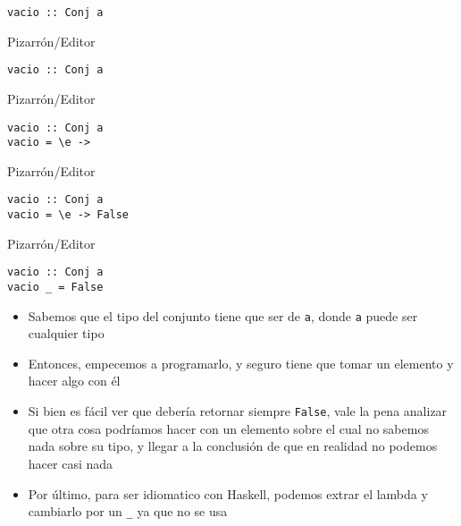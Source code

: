 \documentclass[pdf]{beamer}
\begin{document}
\begin{frame}[fragile]{\texttt{vacio :: Conj a}}

\begin{overprint}
    
\begin{block}{Pizarrón/Editor}
\begin{verbatim}
vacio :: Conj a

\end{verbatim}
\end{block}

\begin{block}{Pizarrón/Editor}
\begin{verbatim}
vacio :: Conj a
vacio = \e ->
\end{verbatim}
\end{block}

\begin{block}{Pizarrón/Editor}
\begin{verbatim}
vacio :: Conj a
vacio = \e -> False
\end{verbatim}
\end{block}

\begin{block}{Pizarrón/Editor}
\begin{verbatim}
vacio :: Conj a
vacio _ = False
\end{verbatim}
\end{block}

\end{overprint}

\begin{itemize}
    \item<1-> Sabemos que el tipo del conjunto tiene que ser de \texttt{a}, donde \texttt{a} puede ser cualquier tipo
    \item<2-> Entonces, empecemos a programarlo, y seguro tiene que tomar un elemento y hacer algo con él
    \item<3-> Si bien es fácil ver que debería retornar siempre \texttt{False}, vale la pena analizar que otra cosa podríamos
    hacer con un elemento sobre el cual no sabemos nada sobre su tipo, y llegar a la conclusión de que en realidad no podemos hacer casi nada
    \item<4-> Por último, para ser idiomatico con Haskell, podemos extrar el lambda y cambiarlo por un \texttt{\_} ya que no se usa
\end{itemize}

\end{frame}
\end{document}
